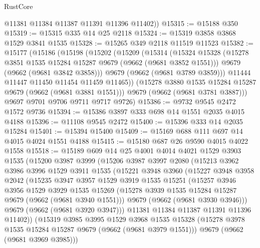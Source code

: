 \begin{lexlean}{RustCore}
\begin{coremodule}
        @11381
        @11384
        @11387
        @11391
        @11396
        @11402))
@15315 := @15188 @350
@15319 := @15315 @335 @14 @25 @2118
@15324 := @15319 @3858 @3868 @1529 @3841 @1535
@15328 := @15265 @349 @2118 @11519 @11523
@15382 := @15177
    (@15186
      (@15198
        (@15202
          (@15209
            (@15314
              (@15324
                @15328
                (@15278 @3851 @1535 @15284 @15287 @9679 (@9662 (@9681 @3852 @1551)))
                @9679
                (@9662 (@9681 @3842 @3858)))
              @9679
              (@9662 (@9681 @3789 @3859)))
            @11444
            @11447
            @11450
            @11454
            @11459
            @11465))
        (@15278 @3880 @1535 @15284 @15287 @9679 (@9662 (@9681 @3881 @1551)))
        @9679
        (@9662 (@9681 @3781 @3887)))
      @9697
      @9701
      @9706
      @9711
      @9717
      @9726)
@15386 := @9732 @9545 @2472 @1572 @9736
@15394 := @15386 @3897 @333 @698 @14 @1551 @2035 @4015 @4188
@15396 := @11108 @9545 @2472
@15400 := @15396 @333 @14 @2035 @15284
@15401 := @15394 @15400
@15409 := @15169 @688 @111 @697 @14 @4015 @4024 @1551 @4188
@15415 := @15180 @687 @26 @9590 @4015 @4022 @1558
@15518 := @15189
    @609
    @14
    @25
    @4001
    @4014
    @4021
    @1529
    @3903
    @1535
    (@15200
      @3987
      @3999
      (@15206
        @3987
        @3997
        @2080
        (@15213
          @3962
          @3986
          @3996
          @1529
          @3911
          @1535
          (@15221
            @3948
            @3960
            (@15227
              @3948
              @3958
              @2042
              (@15235
                @3947
                @3957
                @1529
                @3919
                @1535
                @15251
                (@15257
                  @3946
                  @3956
                  @1529
                  @3929
                  @1535
                  @15269
                  (@15278 @3939 @1535 @15284 @15287 @9679 (@9662 (@9681 @3940 @1551)))
                  @9679
                  (@9662 (@9681 @3930 @3946)))
                @9679
                (@9662 (@9681 @3920 @3947)))
              @11381
              @11384
              @11387
              @11391
              @11396
              @11402))
          (@15319
            @3985
            @3995
            @1529
            @3968
            @1535
            @15328
            (@15278 @3978 @1535 @15284 @15287 @9679 (@9662 (@9681 @3979 @1551)))
            @9679
            (@9662 (@9681 @3969 @3985)))

\end{coremodule}
\end{lexlean}
